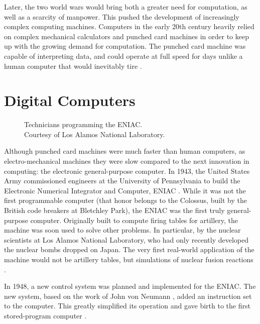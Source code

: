 \documentclass[\rootfolder/main.tex]{subfiles}
\begin{document}
Later, the two world wars would bring both a greater need for computation, as well as a scarcity of manpower.
This pushed the development of increasingly complex computing machines.
Computers in the early 20th century heavily relied on complex mechanical calculators and punched card machines in order to keep up with the growing demand for computation.
The punched card machine was capable of interpreting data, and could operate at full speed for days unlike a human computer that would inevitably tire \cite{carr}.

\section{Digital Computers}

\begin{wrapfigure}{L}{0.6\columnwidth}
    \caption[Technicians programming the ENIAC.]
            {Technicians programming the ENIAC. \\ Courtesy of Los Alamos National Laboratory\label{fig:eniac}.}
\end{wrapfigure}

Although punched card machines were much faster than human computers, as electro-mechanical machines they were slow compared to the next innovation in computing: the electronic general-purpose computer.
In 1943, the United States Army commissioned engineers at the University of Pennsylvania to build the Electronic Numerical Integrator and Computer, ENIAC \cite{sep-computing-history}\cite{reed1952}.
While it was not the first programmable computer (that honor belongs to the Colossus, built by the British code breakers at Bletchley Park\cite{winegrad1996}), the ENIAC was the first truly general-purpose computer.
Originally built to compute firing tables for artillery, the machine was soon used to solve other problems. 
In particular, by the nuclear scientists at Los Alamos National Laboratory, who had only recently developed the nuclear bombs dropped on Japan.
The very first real-world application of the machine would not be artillery tables, but simulations of nuclear fusion reactions \cite{AtomicHeritageFoundation}.

In 1948, a new control system was planned and implemented for the ENIAC.
The new system, based on the work of John von Neumann \cite{VonNeumann1993} \cite{Haigh2014a}, added an instruction set to the computer.
This greatly simplified its operation and gave birth to the first stored-program computer \cite{Rope2007}.
\end{document}
